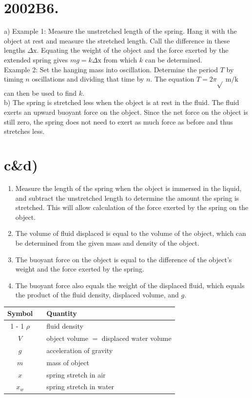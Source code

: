 \begin{enumerate}
\section*{2002B6.}
a) Example 1: Measure the unstretched length of the spring. Hang it with the object at rest and measure the stretched length. Call the difference in these lengths $\Delta \mathrm{x}$. Equating the weight of the object and the force exerted by the extended spring gives $m g=k \Delta \mathrm{x}$ from which $k$ can be determined.\\
Example 2: Set the hanging mass into oscillation. Determine the period $T$ by timing $n$ oscillations and dividing that time by $n$. The equation $T=2 \pi \sqrt{ } \mathrm{~m} / \mathrm{k}$ can then be used to find $k$.\\
b) The spring is stretched less when the object is at rest in the fluid. The fluid exerts an upward buoyant force on the object. Since the net force on the object is still zero, the spring does not need to exert as much force as before and thus stretches less.

\section*{c\&d)}
\begin{enumerate}
  \item Measure the length of the spring when the object is immersed in the liquid, and subtract the unstretched length to determine the amount the spring is stretched. This will allow calculation of the force exerted by the spring on the object.
  \item The volume of fluid displaced is equal to the volume of the object, which can be determined from the given mass and density of the object.
  \item The buoyant force on the object is equal to the difference of the object's weight and the force exerted by the spring.
  \item The buoyant force also equals the weight of the displaced fluid, which equals the product of the fluid density, displaced volume, and $g$.
\end{enumerate}

\begin{center}
\begin{tabular}{cll}
Symbol &  & Quantity \\
\cline { 1 - 1 }
$\rho$ &  & fluid density \\
$V$ &  & object volume $=$ displaced water volume \\
$g$ &  & acceleration of gravity \\
$m$ &  & mass of object \\
$x$ &  & spring stretch in air \\
$x_{w}$ &  & spring stretch in water \\
\end{tabular}
\end{center}


\end{enumerate}
